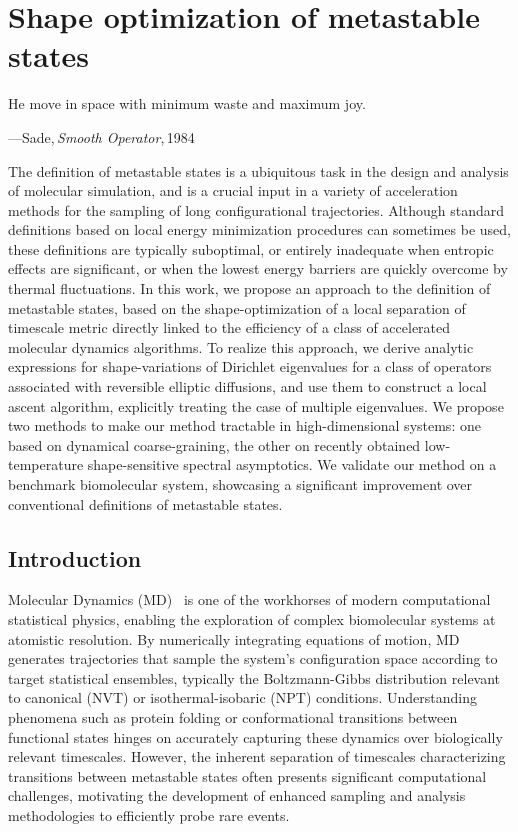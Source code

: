\chapter{Shape optimization of metastable states}
\label{chap:shape_optimization}
\epigraph{He move in space with minimum waste and maximum joy.}{---Sade,\,\textit{Smooth Operator},\,1984}

\begin{chapterabstract}
    The definition of metastable states is a ubiquitous task in the design and analysis of molecular simulation, and is a crucial input in a variety of acceleration methods for the sampling of long configurational trajectories.
    Although standard definitions based on local energy minimization procedures can sometimes be used, these definitions are typically suboptimal, or entirely inadequate when entropic effects are significant, or when the lowest energy barriers are quickly overcome by thermal fluctuations.
    In this work, we propose an approach to the definition of metastable states, based on the shape-optimization of a local separation of timescale metric directly linked to the efficiency of a class of accelerated molecular dynamics algorithms.
    To realize this approach, we derive analytic expressions for shape-variations of Dirichlet eigenvalues for a class of operators associated with reversible elliptic diffusions, and use them to construct a local ascent algorithm, explicitly treating the case of multiple eigenvalues.
    We propose two methods to make our method tractable in high-dimensional systems: one based on dynamical coarse-graining, the other on recently obtained low-temperature shape-sensitive spectral asymptotics.
    We validate our method on a benchmark biomolecular system, showcasing a significant improvement over conventional definitions of metastable states.
\end{chapterabstract}

\section{Introduction}
    \label{03:sec:intro}
    Molecular Dynamics (MD)~\cite{AT17,LM15} is one of the workhorses of modern computational statistical physics, enabling the exploration of complex biomolecular systems at atomistic resolution.
    By numerically integrating equations of motion, MD generates trajectories that sample the system's configuration space according to target statistical ensembles, typically the Boltzmann-Gibbs distribution relevant to canonical (NVT) or isothermal-isobaric (NPT) conditions.
    Understanding phenomena such as protein folding or conformational transitions between functional states hinges on accurately capturing these dynamics over biologically relevant timescales.
    However, the inherent separation of timescales characterizing transitions between metastable states often presents significant computational challenges, motivating the development of enhanced sampling and analysis methodologies to efficiently probe rare events.

